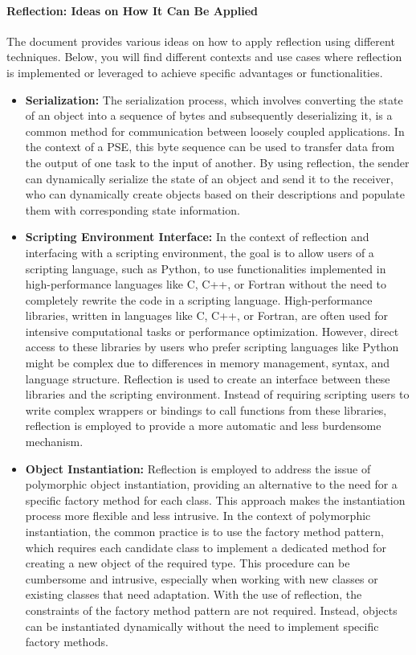 \documentclass[11pt]{article}
\begin{document}
\begin{multicols*}{2}[\columnsep=1cm]
    \paragraph{Reflection: Ideas on How It Can Be Applied}
    The document provides various ideas on how to apply reflection using different techniques. Below, you will find different contexts and use cases where reflection is implemented or leveraged to achieve specific advantages or functionalities.
    
    \begin{itemize}
        \item \textbf{Serialization:}
        The serialization process, which involves converting the state of an object into a sequence of bytes and subsequently deserializing it, is a common method for communication between loosely coupled applications. In the context of a PSE, this byte sequence can be used to transfer data from the output of one task to the input of another. By using reflection, the sender can dynamically serialize the state of an object and send it to the receiver, who can dynamically create objects based on their descriptions and populate them with corresponding state information.
        
        \item \textbf{Scripting Environment Interface:}
        In the context of reflection and interfacing with a scripting environment, the goal is to allow users of a scripting language, such as Python, to use functionalities implemented in high-performance languages like C, C++, or Fortran without the need to completely rewrite the code in a scripting language. High-performance libraries, written in languages like C, C++, or Fortran, are often used for intensive computational tasks or performance optimization. However, direct access to these libraries by users who prefer scripting languages like Python might be complex due to differences in memory management, syntax, and language structure. Reflection is used to create an interface between these libraries and the scripting environment. Instead of requiring scripting users to write complex wrappers or bindings to call functions from these libraries, reflection is employed to provide a more automatic and less burdensome mechanism.
    
        \item \textbf{Object Instantiation:}
        Reflection is employed to address the issue of polymorphic object instantiation, providing an alternative to the need for a specific factory method for each class. This approach makes the instantiation process more flexible and less intrusive. In the context of polymorphic instantiation, the common practice is to use the factory method pattern, which requires each candidate class to implement a dedicated method for creating a new object of the required type. This procedure can be cumbersome and intrusive, especially when working with new classes or existing classes that need adaptation. With the use of reflection, the constraints of the factory method pattern are not required. Instead, objects can be instantiated dynamically without the need to implement specific factory methods.
    \end{itemize}


\end{multicols*}
\end{document}
